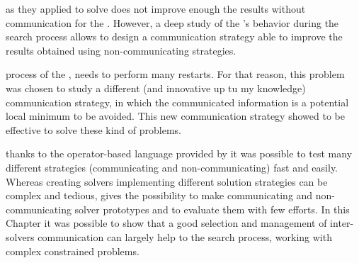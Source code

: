  as they applied to solve \sgp{} does not improve enough the results without communication for the \nqp{}. However, a deep study of the \posl's behavior during the search process allows to design a communication strategy able to improve the results obtained using non-communicating strategies.


 process of the \grp{}, \posl{} needs to perform many restarts. For that reason, this problem was chosen to study a different (and innovative up tu my knowledge) communication strategy, in which the communicated information is a potential local minimum to be avoided. This new communication strategy showed to be effective to solve these kind of problems.

 thanks to the operator-based language provided by \posl{} it was possible to test many different strategies (communicating and non-communicating) fast and easily. Whereas creating solvers implementing different solution strategies can be complex and tedious, \posl{} gives the possibility to make communicating and non-communicating solver prototypes and to evaluate them with few efforts. In this Chapter it was possible to show that a good selection and management of inter-solvers communication can largely help to the search process, working with complex constrained problems.
